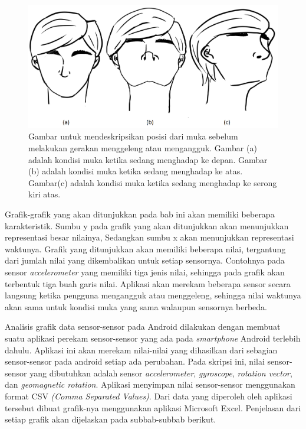 \begin{figure}[htbp]
\centering
\includegraphics[scale=0.4]{Gambar/posisi-muka.png}
\caption{Gambar untuk mendeskripsikan posisi dari muka sebelum melakukan gerakan menggeleng atau mengangguk. Gambar (a) adalah kondisi muka ketika sedang menghadap ke depan. Gambar (b) adalah kondisi muka ketika sedang menghadap ke atas. Gambar(c) adalah kondisi muka ketika sedang menghadap ke serong kiri atas.}
\label{fig:posisi-muka}
\end{figure}

Grafik-grafik yang akan ditunjukkan pada bab ini akan memiliki beberapa karakteristik. Sumbu y pada grafik yang akan ditunjukkan akan menunjukkan representasi besar nilainya, Sedangkan sumbu x akan menunjukkan representasi waktunya. Grafik yang ditunjukkan akan memiliki beberapa nilai, tergantung dari jumlah nilai yang dikembalikan untuk setiap sensornya. Contohnya pada sensor \textit{accelerometer} yang memiliki tiga jenis nilai, sehingga pada grafik akan terbentuk tiga buah garis nilai. Aplikasi akan merekam beberapa sensor secara langsung ketika pengguna mengangguk atau menggeleng, sehingga nilai waktunya akan sama untuk kondisi muka yang sama walaupun sensornya berbeda.

Analisis grafik data sensor-sensor pada Android dilakukan dengan membuat suatu aplikasi perekam sensor-sensor yang ada pada \textit{smartphone} Android terlebih dahulu. Aplikasi ini akan merekam nilai-nilai yang dihasilkan dari sebagian sensor-sensor pada android setiap ada perubahan. Pada skripsi ini, nilai sensor-sensor yang dibutuhkan adalah sensor \textit{accelerometer}, \textit{gyroscope}, \textit{rotation vector}, dan \textit{geomagnetic rotation}. Aplikasi menyimpan nilai sensor-sensor menggunakan format CSV \textit{(Comma Separated Values)}. Dari data yang diperoleh oleh aplikasi tersebut dibuat grafik-nya menggunakan aplikasi Microsoft Excel. Penjelasan dari setiap grafik akan dijelaskan pada subbab-subbab berikut.
